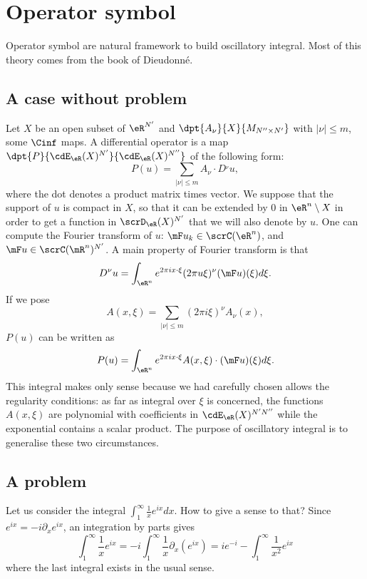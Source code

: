 

\section{Operator symbol}

Operator symbol are natural framework to build oscillatory integral. Most of this theory comes from the book \cite{Dieu7} of Dieudonné.

\subsection{A case without problem}
Let $X$ be an open subset of $\eR^{N'}$ and $\dpt{A_{\nu}}{X}{M_{N''\times N'}}$ with $|\nu|\leq m$, some $\Cinf$ maps. A differential operator is a map $\dpt{P}{\cdE_{\eR}(X)^{N'}}{\cdE_{\eR}(X)^{N''}}$ of the following form:
\[
	P(u)=\sum_{|\nu|\leq m}A_{\nu}\cdot D^{_{\nu}}u,
\]
where the dot denotes a product matrix times vector. We suppose that the support of $u$ is
compact in $X$, so that it can be extended by $0$ in $\eR^n\setminus X$ in order to get a function in $\scrD_{\eR}(X)^{N'}$ that we will also denote by $u$. One can compute the Fourier transform of $u$: $\mF u_k\in\scrC(\eR^n)$, and $\mF u\in\scrC(\mR^n)^{N'}$. A main property of Fourier transform is that
\[
	D^{\nu}u=\int_{\eR^n} e^{2\pi ix\cdot\xi}(2\pi u\xi)^{\nu}(\mF u)(\xi)d\xi.
\]
If we pose
\[
	A(x,\xi)=\sum_{|\nu|\leq m}(2\pi i\xi)^{\nu}A_{\nu}(x),
\]
$P(u)$ can be written as
\[
	P(u)=\int_{\eR^n} e^{2\pi ix\cdot\xi}A(x,\xi)\cdot(\mF u)(\xi)d\xi.
\]
This integral makes only sense because we had carefully chosen allows the regularity conditions: as far as integral over $\xi$ is concerned, the functions $A(x,\xi)$ are polynomial with coefficients in $\cdE_{\eR}(X)^{N'N''}$ while the exponential contains a scalar product. The purpose of oscillatory integral is to generalise these two circumstances.

\subsection{A problem}

Let us consider the integral $\int_1^{\infty}\frac{1}{x}e^{ix}dx$. How to give a sense to that? Since $e^{ix}=-i\partial_xe^{ix}$, an integration by parts gives
\begin{equation}
	\int_1^{\infty}\frac{1}{x}e^{ix}=-i\int_1^{\infty}\frac{1}{x}\partial_x(e^{ix})
	=ie^{-i}-\int_1^{\infty}\frac{1}{x^2}e^{ix}
\end{equation}
where the last integral exists in the usual sense.

